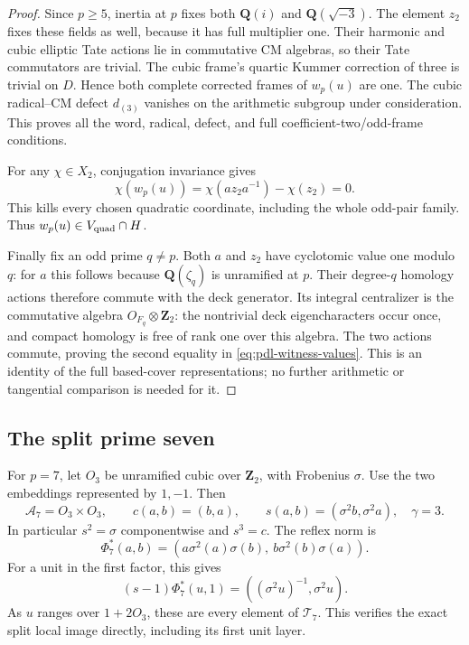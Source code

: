 \begin{proof}
Since \(p\ge5\), inertia at \(p\) fixes both
\(\mathbf Q(i)\) and \(\mathbf Q(\sqrt{-3})\).
The element \(z_2\) fixes these fields as well, because
it has full multiplier one. Their harmonic and cubic
elliptic Tate actions lie in commutative CM algebras,
so their Tate commutators are trivial. The cubic frame's
quartic Kummer correction of three is trivial on \(D\).
Hence both complete corrected frames of \(w_p(u)\)
are one. The cubic radical--CM defect \(d_{(3)}\)
vanishes on the arithmetic subgroup under consideration.
This proves all the word, radical, defect, and full
coefficient-two/odd-frame conditions.

For any \(\chi\in X_2\), conjugation invariance gives
\[
                  \chi(w_p(u))
                    =\chi(a z_2a^{-1})-\chi(z_2)=0.
\]
This kills every chosen quadratic coordinate, including
the whole odd-pair family. Thus \(w_p(u)\in V_{\rm quad}\cap H\).

Finally fix an odd prime \(q\ne p\). Both \(a\) and
\(z_2\) have cyclotomic value one modulo \(q\): for
\(a\) this follows because \(\mathbf Q(\zeta_q)\) is
unramified at \(p\). Their degree-\(q\) homology actions
therefore commute with the deck generator. Its integral
centralizer is the commutative algebra
\(O_{F_q}\otimes\mathbf Z_2\): the nontrivial deck
eigencharacters occur once, and compact homology is
free of rank one over this algebra. The two actions
commute, proving the second equality in
\eqref{eq:pdl-witness-values}. This is an identity of the
full based-cover representations; no further
arithmetic or tangential comparison is needed for it.
\end{proof}

\subsection{The split prime seven}

For \(p=7\), let \(O_3\) be unramified cubic over
\(\mathbf Z_2\), with Frobenius \(\sigma\). Use the two
embeddings represented by \(1,-1\). Then
\[
 \mathcal A_7=O_3\times O_3,\qquad
 c(a,b)=(b,a),\qquad
 s(a,b)=(\sigma^2 b,\sigma^2 a),\quad \gamma=3.
\]
In particular \(s^2=\sigma\) componentwise and \(s^3=c\).
The reflex norm is
\begin{equation}\label{eq:pdl-seven-reflex}
 \Phi_7^*(a,b)
       =(a\sigma^2(a)\sigma(b),\ b\sigma^2(b)\sigma(a)).
\end{equation}
For a unit in the first factor, this gives
\[
 (s-1)\Phi_7^*(u,1)
                         =((\sigma^2u)^{-1},\sigma^2u).
\]
As \(u\) ranges over \(1+2O_3\), these are every
element of \(\mathcal T_7\). This verifies the exact
split local image directly, including its first unit layer.

